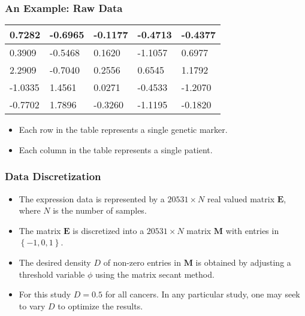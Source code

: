 \documentclass[
	11pt, %
]{beamer}
\begin{document}
\begin{frame}
	\frametitle{An Example: Raw Data}
	\begin{table}
        \begin{tabular}{|l|l|l|l|l|}
        \hline
        0.7282 & -0.6965 & -0.1177 & -0.4713 & -0.4377 \\ \hline
        0.3909 & -0.5468 & 0.1620 & -1.1057 & 0.6977 \\ \hline
        2.2909 & -0.7040 & 0.2556 & 0.6545 & 1.1792 \\ \hline
        -1.0335 & 1.4561 & 0.0271 & -0.4533 & -1.2070 \\ \hline
        -0.7702 & 1.7896 & -0.3260 & -1.1195 & -0.1820 \\ \hline
    \end{tabular}
    \end{table}

    \begin{itemize}
        \pause
        \item Each row in the table represents a single genetic marker.
        \pause
        \item Each column in the table represents a single patient.
    \end{itemize}
\end{frame}

\begin{frame}
	\frametitle{Data Discretization}
	
	\begin{itemize}
        \item The expression data is represented by a $20531 \times N$ real valued matrix $\mathbf{E}$, where $N$ is the number of samples.
        \pause
        \item The matrix $\mathbf{E}$ is discretized into a $20531 \times N$ matrix $\mathbf{M}$ with entries in $\left\{ -1, 0, 1\right\}$.
        \pause
        \item The desired density $D$ of non-zero entries in $\mathbf{M}$ is obtained by adjusting a threshold variable $\phi$ using the matrix secant method.
        \pause
        \item For this study $D = 0.5$ for all cancers. In any particular study, one may seek to vary $D$ to optimize the results.
    \end{itemize}
\end{frame}

\end{document}
